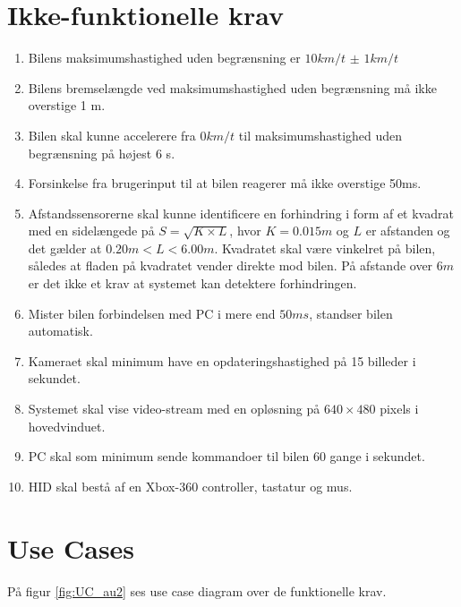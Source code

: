 \section{Ikke-funktionelle krav} \label{sec:ikke-funktionelle_krav}
\begin{enumerate}\itemsep1pt \parskip0pt 
	\item Bilens maksimumshastighed uden begrænsning er $10km/t$ $\pm$ $1km/t$ %
	\item Bilens bremselængde ved maksimumshastighed uden begrænsning må ikke overstige 1 m. %
	\item Bilen skal kunne accelerere fra $0 km/t$ til maksimumshastighed uden begrænsning på højest 6 s. %
	\item Forsinkelse fra brugerinput til at bilen reagerer må ikke overstige 50ms. %
	\item Afstandssensorerne skal kunne identificere en forhindring i form af et kvadrat med en sidelængede på $S = \sqrt{K \times L}$, hvor $K = 0.015m$ og $L$ er afstanden og det gælder at $0.20m<L<6.00m$. Kvadratet skal være vinkelret på bilen, således at fladen på kvadratet vender direkte mod bilen. På afstande over $6 m$ er det ikke et krav at systemet kan detektere forhindringen. %
	\item Mister bilen forbindelsen med PC i mere end $50ms$, standser bilen automatisk. 
	\item Kameraet skal minimum have en opdateringshastighed på 15 billeder i sekundet. %
	\item Systemet skal vise video-stream med en opløsning på $640 \times 480$ pixels i hovedvinduet.
	\item PC skal som minimum sende kommandoer til bilen 60 gange i sekundet. 
	\item HID skal bestå af en Xbox-360 controller, tastatur og mus.
\end{enumerate}
\clearpage

\section{Use Cases}
På figur \ref{fig:UC_au2} ses use case diagram over de funktionelle krav. 

